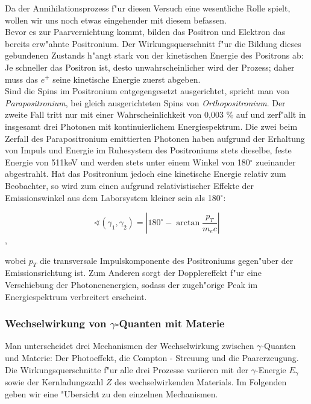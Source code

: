 \documentclass{article}
\begin{document}
Da der Annihilationsprozess f"ur diesen Versuch eine wesentliche Rolle spielt, wollen wir uns noch etwas eingehender mit diesem befassen.\\
Bevor es zur Paarvernichtung kommt, bilden das Positron und Elektron das bereits erw"ahnte Positronium. Der Wirkungsquerschnitt f"ur die Bildung dieses gebundenen Zustands h"angt stark von der kinetischen Energie des Positrons ab: Je schneller das Positron ist, desto unwahrscheinlicher wird der Prozess; daher muss das $e^+$ seine kinetische Energie zuerst abgeben.\\
Sind die Spins im Positronium entgegengesetzt ausgerichtet, spricht man von \textit{Parapositronium}, bei gleich ausgerichteten Spins von \textit{Orthopositronium}. Der zweite Fall tritt nur mit einer Wahrscheinlichkeit von 0,003 \% auf und zerf"allt in insgesamt drei Photonen mit kontinuierlichem Energiespektrum. Die zwei beim Zerfall des Parapositronium emittierten Photonen haben aufgrund der Erhaltung von Impuls und Energie im Ruhesystem des Positroniums stets dieselbe, feste Energie von 511keV und werden stets unter einem Winkel von 180$^{\circ}$ zueinander abgestrahlt. Hat das Positronium jedoch eine kinetische Energie relativ zum Beobachter, so wird zum einen aufgrund relativistischer Effekte der Emissionswinkel aus dem Laborsystem kleiner sein als 180$^{\circ}$:

\begin{equation}
\sphericalangle (\gamma_1, \gamma_2) = |180^{\circ} - \arctan{\frac{p_T}{m_e c}}|
\end{equation},

wobei $p_T$ die transversale Impulskomponente des Positroniums gegen"uber der Emissionsrichtung ist. Zum Anderen sorgt der Dopplereffekt f"ur eine Verschiebung der Photonenenergien, sodass der zugeh"orige Peak im Energiespektrum verbreitert erscheint.



\subsubsection{Wechselwirkung von $\gamma$-Quanten mit Materie}

Man unterscheidet drei Mechanismen der Wechselwirkung zwischen $\gamma$-Quanten und Materie: Der Photoeffekt, die Compton - Streuung und die Paarerzeugung. Die Wirkungsquerschnitte f"ur alle drei Prozesse variieren mit der $\gamma$-Energie $E_{\gamma}$ sowie der Kernladungszahl $Z$ des wechselwirkenden Materials.
Im Folgenden geben wir eine "Ubersicht zu den einzelnen Mechanismen.
\end{document}
